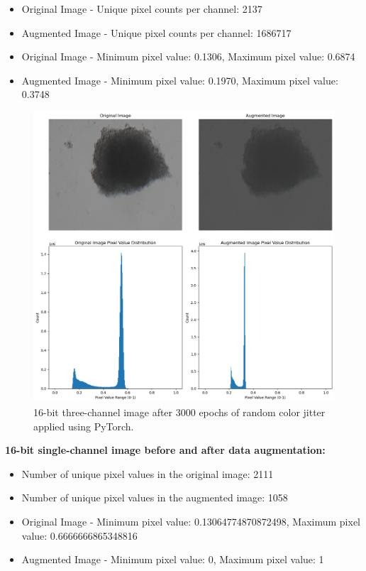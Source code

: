   \begin{itemize}
    \item Original Image - Unique pixel counts per channel: 2137
    \item Augmented Image - Unique pixel counts per channel: 1686717
    \item Original Image - Minimum pixel value: 0.1306, Maximum pixel value: 0.6874
    \item Augmented Image -  Minimum pixel value: 0.1970, Maximum pixel value: 0.3748
  \end{itemize}
  
  \begin{figure}[H]
    \centering
    \includegraphics[scale=0.5]{figures/16bithree2.png} 
    \caption{16-bit three-channel image after 3000 epochs of random color jitter applied using PyTorch.}
    \label{fig:16bit_three_v2}
  \end{figure}
  
  \textbf{16-bit single-channel image before and after data augmentation:}
  \begin{itemize}
    \item Number of unique pixel values in the original image: 2111
    \item Number of unique pixel values in the augmented image: 1058
    \item Original Image - Minimum pixel value:  0.13064774870872498, Maximum pixel value: 0.6666666865348816
    \item Augmented Image - Minimum pixel value: 0, Maximum pixel value: 1
  \end{itemize}
  
